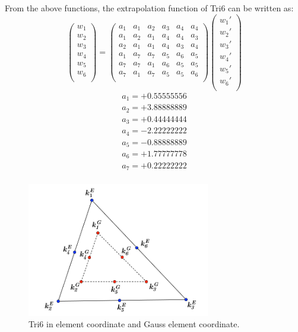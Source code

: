 From the above functions, the extrapolation function of Tri6 can be written as:
\begin{equation}
\begin{pmatrix}
w_1 \\
w_2 \\
w_3 \\
w_4 \\
w_5 \\
w_6 \\
\end{pmatrix} = \begin{pmatrix}
a_1 & a_1 &  a_2 &  a_3 & a_4 & a_4     \\[0.3em]
a_1 & a_2 &  a_1 &  a_4 & a_4 & a_3     \\[0.3em]
a_2 & a_1 &  a_1 &  a_4 & a_3 & a_4     \\[0.3em]
a_1 & a_7 &  a_7 &  a_5 & a_6 & a_5     \\[0.3em]
a_7 & a_7 &  a_1 &  a_6 & a_5 & a_5     \\[0.3em]
a_7 & a_1 &  a_7 &  a_5 & a_5 & a_6     \\[0.3em]            
\end{pmatrix} \begin{pmatrix}
{w_1}' \\
{w_2}' \\
{w_3}' \\
{w_4}' \\
{w_5}' \\
{w_6}' \\
\end{pmatrix}
\end{equation}	
\begin{align*}
a_1 = +0.55555556 \\
a_2 = +3.88888889 \\
a_3 = +0.44444444 \\
a_4 = -2.22222222 \\
a_5 = -0.88888889 \\
a_6 = +1.77777778 \\
a_7 = +0.22222222 \\
\end{align*}



\begin{figure}[h]
	\begin{center}
		\includegraphics[width=8cm,clip]{Tri6_1.pdf} 		
		\caption{Tri6 in element coordinate and Gauss element coordinate.} \label{fig: Tri6_1}	
	\end{center} 
\end{figure}

